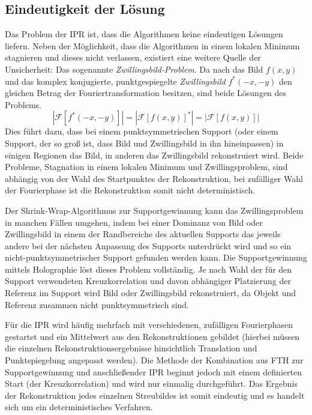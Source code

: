 \subsection{Eindeutigkeit der Lösung}
Das Problem der IPR ist, dass die Algorithmen keine eindeutigen Lösungen liefern. Neben der Möglichkeit, dass die Algorithmen in einem lokalen Minimum stagnieren und dieses nicht verlassen, existiert eine weitere Quelle der Unsicherheit: Das sogenannte \textit{Zwillingsbild-Problem}. Da nach  das Bild $f(x,y)$ und das komplex konjugierte, punktgespiegelte \textit{Zwillingsbild}  $f^*(-x,-y)$ den gleichen Betrag der Fouriertransformation besitzen, sind beide Lösungen des Problems.
\begin{equation}
	\label{eq:zwilling}
	\left|\mathscr{F}[f^*(-x,-y)]\right|=\left|\mathscr{F}[f(x,y)]^*\right|=\left|\mathscr{F}[f(x,y)]\right|
\end{equation}
Dies führt dazu, dass bei einem punktsymmetrischen Support (oder einem Support, der so groß ist, dass Bild und Zwillingsbild in ihn hineinpassen) in einigen Regionen das Bild, in anderen das Zwillingsbild rekonstruiert wird. Beide Probleme, Stagnation in einem lokalen Minimum und Zwillingsproblem, sind abhängig von der Wahl des Startpunktes der Rekonstruktion, bei zufälliger Wahl der Fourierphase ist die Rekonstruktion somit nicht deterministisch.

Der Shrink-Wrap-Algorithmus zur Supportgewinnung kann das Zwillingsproblem in manchen Fällen umgehen, indem bei einer Dominanz von Bild oder Zwillingsbild in einem der Randbereiche des aktuellen Supports das jeweils andere bei der nächsten Anpassung des Supports unterdrückt wird und so ein nicht-punktsymmetrischer Support gefunden werden kann.
Die Supportgewinnung mittels Holographie löst dieses Problem vollständig. Je nach Wahl der für den Support verwendeten Kreuzkorrelation und davon abhängiger Platzierung der Referenz im Support wird Bild oder Zwillingsbild rekonstruiert, da Objekt und Referenz zusammen nicht punktsymmetrisch sind.

Für die IPR wird häufig mehrfach mit verschiedenen, zufälligen Fourierphasen gestartet und ein Mittelwert aus den Rekonstruktionen gebildet (hierbei müssen die einzelnen Rekonstruktionsergebnisse hinsichtlich Translation und Punktspiegelung angepasst werden). Die Methode der Kombination aus FTH zur Supportgewinnung und anschließender IPR beginnt jedoch mit einem definierten Start (der Kreuzkorrelation) und wird nur einmalig durchgeführt. Das Ergebnis der Rekonstruktion jedes einzelnen Streubildes ist somit eindeutig und es handelt sich um ein deterministisches Verfahren.

